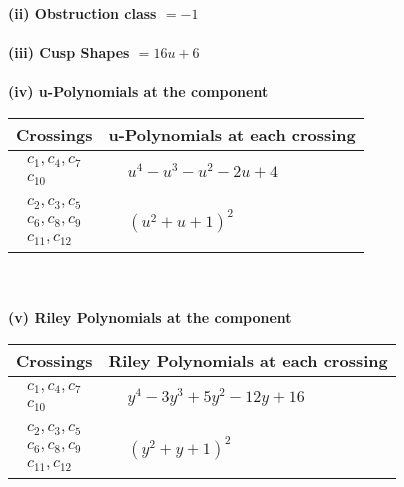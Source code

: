 \documentclass[1p]{elsarticle_modified}
\theoremstyle{definition}
\begin{document}
\flushleft \textbf{(ii) Obstruction class $= -1$}\\~\\
\flushleft \textbf{(iii) Cusp Shapes $= 16 u+6$}\\~\\
\newpage\renewcommand{\arraystretch}{1}
\flushleft \textbf{(iv) u-Polynomials at the component}\newline \\
\begin{tabular}{m{50pt}|m{274pt}}
Crossings & \hspace{64pt}u-Polynomials at each crossing \\
\hline $$\begin{aligned}c_{1},c_{4},c_{7}\\c_{10}\end{aligned}$$&$\begin{aligned}
&u^4- u^3- u^2-2 u+4
\end{aligned}$\\
\hline $$\begin{aligned}c_{2},c_{3},c_{5}\\c_{6},c_{8},c_{9}\\c_{11},c_{12}\end{aligned}$$&$\begin{aligned}
&(u^2+u+1)^2
\end{aligned}$\\
\hline
\end{tabular}\\~\\
\newpage\renewcommand{\arraystretch}{1}
\flushleft \textbf{(v) Riley Polynomials at the component}\newline \\
\begin{tabular}{m{50pt}|m{274pt}}
Crossings & \hspace{64pt}Riley Polynomials at each crossing \\
\hline $$\begin{aligned}c_{1},c_{4},c_{7}\\c_{10}\end{aligned}$$&$\begin{aligned}
&y^4-3 y^3+5 y^2-12 y+16
\end{aligned}$\\
\hline $$\begin{aligned}c_{2},c_{3},c_{5}\\c_{6},c_{8},c_{9}\\c_{11},c_{12}\end{aligned}$$&$\begin{aligned}
&(y^2+y+1)^2
\end{aligned}$\\
\hline
\end{tabular}\\~\\
\end{document}
